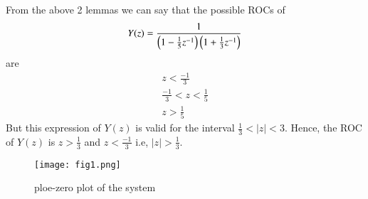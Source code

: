 \documentclass[journal,12pt,twocolumn]{IEEEtran}
\begin{document}
 From the above 2 lemmas we can say that the possible ROCs of
 \begin{align}
     Y(z)= \frac{1}{\left(1-\frac{1}{5}{z^{-1}}\right)\left(1+\frac{1}{3}z^{-1}\right)} 
 \end{align}
 are 
 \begin{align}
     z<\frac{-1}{3}\\
     \frac{-1}{3}<z<\frac{1}{5}\\
     z>\frac{1}{5}
 \end{align}
 But this expression of $Y(z)$ is valid for the interval $\frac{1}{3}<|z|<3$. Hence, the ROC of $Y(z)$ is $z>\frac{1}{3}$ and $z<\frac{-1}{3}$ i.e, $|z|>\frac{1}{3}$.
\begin{figure}[htp]
    \centering
    \texttt{[image: fig1.png]}
    \caption{ploe-zero plot of the system}
\end{figure}
\end{document}
